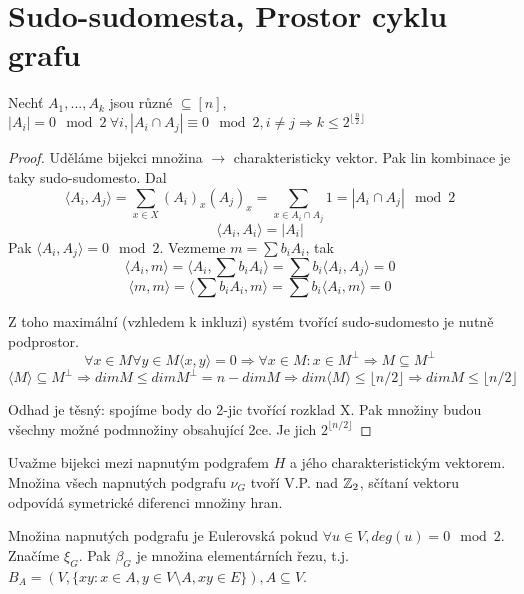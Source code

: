 \section{\texorpdfstring{Sudo-sudomesta, Prostor cyklu grafu}{Sudo-sudomesta, Prostor cyklu grafu}}
\vspace{5mm}
\large

\begin{theorem}
	Nechť $A_1, ... , A_k$ jsou různé $ \subseteq [n]$, $ |A_i| = 0 \mod2 \ \forall i, |A_i \cap A_j| \equiv 0 \mod2, i \ne j \Rightarrow k \leq 2^{\lfloor \frac{n}{2} \rfloor }$
\end{theorem}
\begin{proof}
	Uděláme bijekci množina $\to$ charakteristicky vektor. Pak lin kombinace je taky sudo-sudomesto. Dal
	\[ \langle A_i, A_j \rangle = \sum_{x \in X} (A_i)_x (A_j)_x = \sum_{x \in A_i \cap A_j} 1 = |A_i \cap A_j| \mod2 \]
	\[ \langle A_i, A_i \rangle = |A_i| \]
	Pak $ \langle A_i, A_j \rangle = 0 \mod2 $. Vezmeme $ m = \sum b_iA_i $, tak
	\[ \langle A_i, m \rangle = \langle A_i, \sum b_iA_i \rangle = \sum b_i \langle A_i, A_j \rangle = 0 \]
	\[ \langle m,m \rangle = \langle \sum b_iA_i, m \rangle = \sum b_i \langle A_i, m \rangle = 0 \]

	Z toho maximální (vzhledem k inkluzi) systém tvořící sudo-sudomesto je nutně podprostor.
	\[ \forall x \in M \forall y \in M \langle x, y \rangle = 0 \Rightarrow \forall x \in M: x \in M^{\perp} \Rightarrow M \subseteq M^{\perp} \]
	\[ \langle M \rangle \subseteq M^{\perp} \Rightarrow dim M \leq dim M^{\perp} = n - dim M \Rightarrow dim \langle M \rangle \leq \lfloor n/2 \rfloor \Rightarrow dim M \leq \lfloor n/2 \rfloor \]

	Odhad je těsný: spojíme body do 2-jic tvořící rozklad X. Pak množiny budou všechny možné podmnožiny obsahující 2ce. Je jich $ 2^{\lfloor n/2 \rfloor} $
\end{proof}


\begin{definition}
Uvažme bijekci mezi napnutým podgrafem $H$ a jého charakteristickým vektorem. Množina všech napnutých podgrafu $\nu_G$ tvoří V.P. nad $\operatorname{\mathbb{Z}}_2$, sčítaní vektoru odpovídá symetrické diferenci množiny hran.
\end{definition}
\begin{definition}
	Množina napnutých podgrafu je Eulerovská pokud $\forall u \in V, deg(u) = 0 \mod2$. Značíme $\xi_G$. Pak $\beta_G$ je množina elementárních řezu, t.j. $B_A = (V, \{xy: x \in A, y\in V\setminus A, xy\in E\}), A \subseteq V$.
\end{definition}

